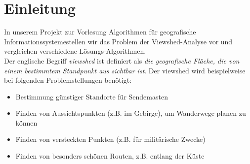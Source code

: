\section{Einleitung}
In unserem Projekt zur Vorlesung \glqq Algorithmen für geografische Informationssysteme\grqq stellen wir das Problem der \glqq Viewshed\grqq-Analyse vor und 
vergleichen verschiedene Lösungs-Algorithmen. \\ Der englische Begriff \textit{viewshed} ist definiert als \textit{die geografische Fläche, die 
von einem bestimmtem Standpunkt aus sichtbar ist}. Der viewshed wird beispielweise bei folgenden Problemstellungen benötigt:
\begin{itemize}
 \item Bestimmung günstiger Standorte für Sendemasten
 \item Finden von Aussichtspunkten (z.B. im Gebirge), um Wanderwege planen zu können
 \item Finden von versteckten Punkten (z.B. für militärische Zwecke)
 \item Finden von besonders schönen Routen, z.B. entlang der Küste 
\end{itemize}
